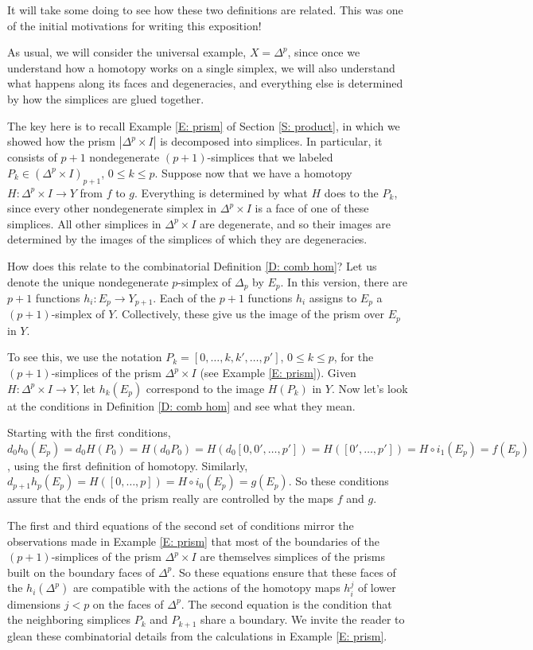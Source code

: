 \documentclass[12pt]{article}
\theoremstyle{plain}
\theoremstyle{definition}
\begin{document}
It will take some doing to see how these two definitions are related. This was one of the initial motivations for writing this exposition!

As usual, we will consider the universal example, $X=\Delta^p$, since once we understand how a homotopy works on a single simplex, we will also understand what happens along its faces and degeneracies, and everything else is determined by how the simplices are glued together. 

The key here is to recall Example \ref{E: prism} of Section \ref{S: product}, in which we showed how the prism $|\Delta^p\times I|$ is decomposed into simplices. In particular, it consists of $p+1$ nondegenerate $(p+1)$-simplices that we labeled $P_k\in (\Delta^p\times I)_{p+1}$, $0\leq k\leq p$. Suppose now that we have a homotopy $H\colon \Delta^p\times I\to Y$ from $f$ to $g$. Everything is determined by what $H$ does to the $P_k$, since every other nondegenerate simplex in $\Delta^p\times I$ is a face of one of these simplices. All other simplices in $\Delta^p\times I$ are degenerate, and so their images are determined by the images of the simplices of which they are degeneracies. 

How does this relate to the combinatorial Definition \ref{D: comb hom}? Let us denote the unique nondegenerate $p$-simplex of $\Delta_p$ by $E_p$. In this version, there are $p+1$ functions $h_i\colon E_p\to Y_{p+1}$. Each of the $p+1$ functions $h_i$ assigns to  $E_p$ a $(p+1)$-simplex of $Y$. Collectively, these give us the image of the prism over $E_p$ in $Y$. 

To see this, we use the notation $P_k=[0,\ldots,k,k',\ldots,p']$, $0\leq k\leq p$, for the $(p+1)$-simplices of the prism $\Delta^p\times I$ (see Example \ref{E: prism}). Given $H\colon \Delta^p\times I\to Y$, let  $h_k(E_p)$  correspond to the image $H(P_k)$ in $Y$. Now let's look at the conditions in  Definition \ref{D: comb hom} and see what they mean.

Starting with the first conditions, $d_0h_0(E_p)=d_0H(P_0)=H(d_0P_0)=H(d_0[0,0',\dots,p'])=H([0',\ldots, p'])=H\circ i_1(E_p)=f(E_p)$, using the first definition of homotopy. Similarly, $d_{p+1}h_p(E_p)=H([0,\ldots, p])=H\circ i_0(E_p)=g(E_p)$. So these conditions assure that the ends of the prism really are controlled by the maps $f$ and $g$.

The first and third equations of the second set of conditions mirror the observations made in Example \ref{E: prism} that most of the boundaries of the $(p+1)$-simplices of the prism $\Delta^p\times I$ are themselves  simplices of the prisms built on the boundary faces of $\Delta^p$. So these equations ensure that these faces of the $h_i(\Delta^p)$ are compatible with the actions of the homotopy maps $h_i^{j}$ of lower dimensions $j<p$ on the faces of $\Delta^p$. The second equation is the condition that the neighboring simplices $P_k$ and $P_{k+1}$ share a boundary. We invite the reader to glean these combinatorial details from the calculations in Example \ref{E: prism}.
\end{document}
